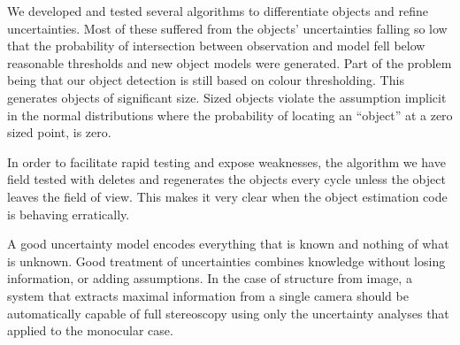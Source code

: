 \documentclass{article}
\newcounter{subsubsubsection}[subsubsection]
\begin{document}
        We developed and tested several algorithms to differentiate objects and refine uncertainties.
        Most of these suffered from the objects' uncertainties falling so low that the probability of intersection between observation and model fell below reasonable thresholds and new object models were generated.  Part of the problem being that our object detection is still based on colour thresholding.  This generates objects of significant size.  Sized objects violate the assumption implicit in the normal distributions where the probability of locating an ``object'' at a zero sized point, is zero.

        In order to facilitate rapid testing and expose weaknesses, the algorithm we have field tested with deletes and regenerates the objects every cycle unless the object leaves the field of view.  This makes it very clear when the object estimation code is behaving erratically.
        \label{sec:UncertaintyAnalysis}

        A good uncertainty model encodes everything that is known and nothing of what is unknown.  Good treatment of uncertainties combines knowledge without losing information, or adding assumptions.
        In the case of structure from image, a system that extracts maximal information from a single camera should be automatically capable of full stereoscopy using only the uncertainty analyses that applied to the monocular case.
      
\end{document}
